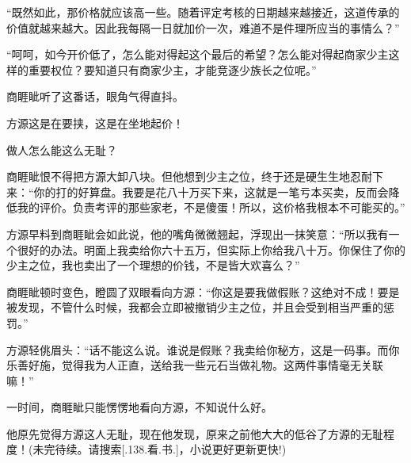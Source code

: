 \begin{this_body}
“既然如此，那价格就应该高一些。随着评定考核的日期越来越接近，这道传承的价值就越来越大。因此我每隔一日就加价一次，难道不是件理所应当的事情么？”

“呵呵，如今开价低了，怎么能对得起这个最后的希望？怎么能对得起商家少主这样的重要权位？要知道只有商家少主，才能竞逐少族长之位呢。”

商睚眦听了这番话，眼角气得直抖。

方源这是在要挟，这是在坐地起价！

做人怎么能这么无耻？

商睚眦恨不得把方源大卸八块。但他想到少主之位，终于还是硬生生地忍耐下来：“你的打的好算盘。我要是花八十万买下来，这就是一笔亏本买卖，反而会降低我的评价。负责考评的那些家老，不是傻蛋！所以，这价格我根本不可能买的。”

方源早料到商睚眦会如此说，他的嘴角微微翘起，浮现出一抹笑意：“所以我有一个很好的办法。明面上我卖给你六十五万，但实际上你给我八十万。你保住了你的少主之位，我也卖出了一个理想的价钱，不是皆大欢喜么？”

商睚眦顿时变色，瞪圆了双眼看向方源：“你这是要我做假账？这绝对不成！要是被发现，不管什么时候，我都会立即被撤销少主之位，并且会受到相当严重的惩罚。”

方源轻佻眉头：“话不能这么说。谁说是假账？我卖给你秘方，这是一码事。而你乐善好施，觉得我为人正直，送给我一些元石当做礼物。这两件事情毫无关联嘛！”

一时间，商睚眦只能愣愣地看向方源，不知说什么好。

他原先觉得方源这人无耻，现在他发现，原来之前他大大的低谷了方源的无耻程度！(未完待续。请搜索[.138.看.书.]，小说更好更新更快!)

\end{this_body}

